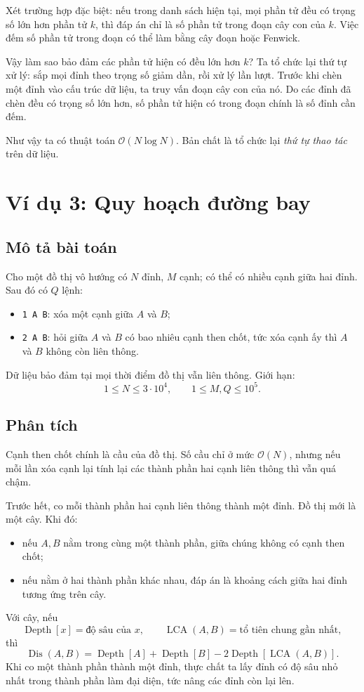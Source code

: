 \documentclass[11pt]{article}
\newcommand{\Oh}{\mathcal{O}}
\newcommand{\LCA}{\operatorname{LCA}}
\newcommand{\Depth}{\operatorname{Depth}}
\newcommand{\Dis}{\operatorname{Dis}}
\begin{document}
Xét trường hợp đặc biệt: nếu trong danh sách hiện tại, mọi phần tử đều có
trọng số lớn hơn phần tử \(k\), thì đáp án chỉ là số phần tử trong đoạn cây con
của \(k\). Việc đếm số phần tử trong đoạn có thể làm bằng cây đoạn hoặc Fenwick.

Vậy làm sao bảo đảm các phần tử hiện có đều lớn hơn \(k\)? Ta tổ chức lại thứ
tự xử lý: sắp mọi đỉnh theo trọng số giảm dần, rồi xử lý lần lượt. Trước khi
chèn một đỉnh vào cấu trúc dữ liệu, ta truy vấn đoạn cây con của nó. Do các
đỉnh đã chèn đều có trọng số lớn hơn, số phần tử hiện có trong đoạn chính là
số đỉnh cần đếm.

Như vậy ta có thuật toán \(\Oh(N\log N)\). Bản chất là tổ chức lại \emph{thứ
tự thao tác} trên dữ liệu.

\section{Ví dụ 3: Quy hoạch đường bay}

\subsection*{Mô tả bài toán}

Cho một đồ thị vô hướng có \(N\) đỉnh, \(M\) cạnh; có thể có nhiều cạnh giữa
hai đỉnh. Sau đó có \(Q\) lệnh:
\begin{itemize}
  \item \texttt{1 A B}: xóa một cạnh giữa \(A\) và \(B\);
  \item \texttt{2 A B}: hỏi giữa \(A\) và \(B\) có bao nhiêu cạnh then chốt,
  tức xóa cạnh ấy thì \(A\) và \(B\) không còn liên thông.
\end{itemize}
Dữ liệu bảo đảm tại mọi thời điểm đồ thị vẫn liên thông. Giới hạn:
\[
  1\le N\le 3\cdot 10^4,\qquad
  1\le M,Q\le 10^5.
\]

\subsection*{Phân tích}

Cạnh then chốt chính là cầu của đồ thị. Số cầu chỉ ở mức \(\Oh(N)\), nhưng nếu
mỗi lần xóa cạnh lại tính lại các thành phần hai cạnh liên thông thì vẫn quá
chậm.

Trước hết, co mỗi thành phần hai cạnh liên thông thành một đỉnh. Đồ thị mới là
một cây. Khi đó:
\begin{itemize}
  \item nếu \(A,B\) nằm trong cùng một thành phần, giữa chúng không có cạnh then
  chốt;
  \item nếu nằm ở hai thành phần khác nhau, đáp án là khoảng cách giữa hai đỉnh
  tương ứng trên cây.
\end{itemize}
Với cây, nếu
\[
  \Depth[x]=\text{độ sâu của }x,\qquad
  \LCA(A,B)=\text{tổ tiên chung gần nhất},
\]
thì
\[
  \Dis(A,B)=\Depth[A]+\Depth[B]-2\Depth[\LCA(A,B)].
\]
Khi co một thành phần thành một đỉnh, thực chất ta lấy đỉnh có độ sâu nhỏ nhất
trong thành phần làm đại diện, tức nâng các đỉnh còn lại lên.
\end{document}
